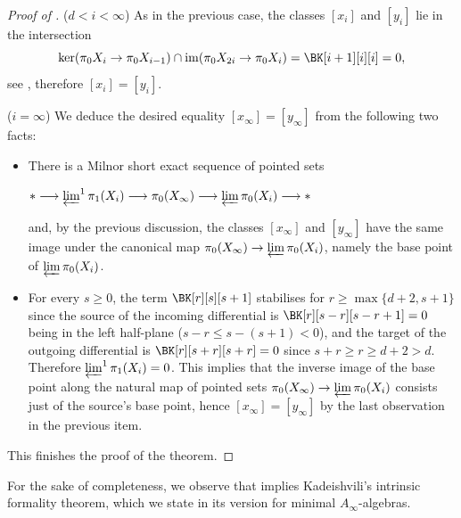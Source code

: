 \documentclass[a4paper]{amsart}
\begin{document}
\begin{proof}[Proof of ]
   ($d<i<\infty$) As in the previous case, the classes $[x_i]$ and $[y_i]$
      lie in the intersection
    \[
      \ker(\pi_0 X_i\to \pi_0 X_{i-1})\cap\operatorname{im}(\pi_0
      X_{2i}\to\pi_0 X_i)=\BK[i+1][i][i]=0,
    \]
    see \cite[Eqn.~4.8]{Mur20b}, therefore $[x_i]=[y_i]$.

    ($i=\infty$) We deduce the desired equality $[x_\infty]=[y_\infty]$ from the following two facts:
    \begin{itemize}
    \item \cite[Sec.~IX.3.1]{BK72} There is a Milnor short
      exact sequence of pointed sets
      \begin{center}
        $*\longrightarrow\varprojlim\nolimits^1\pi_{1}(X_i)\longrightarrow\pi_0(X_\infty)\longrightarrow\varprojlim
        \pi_0(X_i)\longrightarrow *$
      \end{center}
      and, by the previous discussion, the classes $[x_\infty]$ and $[y_\infty]$ have
      the same image under the canonical map
      $\pi_0(X_\infty)\to\varprojlim\pi_0(X_i)$, namely the base point of $\varprojlim
      \pi_0(X_i)$.
    \item \cite[Sec.~IX.5.4]{BK72} For every $s\geq 0$, the term
    $\BK[r][s][s+1]$ stabilises for $r\geq \max\{d+2,s+1\}$ since the source of the incoming differential is $\BK[r][s-r][s-r+1]=0$ being in the left half-plane ($s-r\leq s-(s+1)<0$), and the target of the outgoing differential is $\BK[r][s+r][s+r]=0$ since $s+r\geq r\geq d+2>d$. Therefore  $\varprojlim\nolimits^1\pi_1(X_i)=0$. This implies that the inverse image of the base point along 
    the natural map of pointed sets
    $\pi_0(X_\infty)\to\varprojlim\pi_0(X_i)$ consists just of the source's base point, hence $[x_\infty]=[y_\infty]$ by the last observation in the previous item.
    \end{itemize}
    This finishes the proof of the theorem.
\end{proof}

For the sake of completeness, we observe that 
implies Kadeishvili's intrinsic formality theorem, which we state in its version
for minimal $A_\infty$-algebras.
\end{document}
